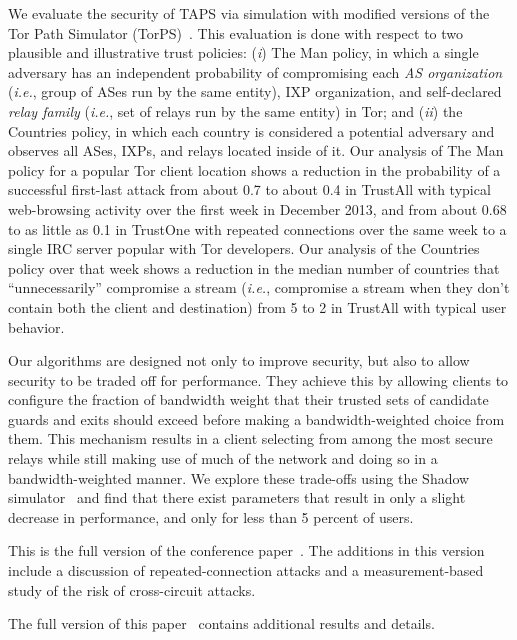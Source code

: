 \documentclass[conference]{styles/IEEEtran}
\newcommand{\ie}{\emph{i.e.}}
\newcommand{\ps}{TAPS\xspace}
\begin{document}
We evaluate the security of \ps via simulation with modified versions of the Tor Path Simulator
(TorPS)~\cite{ccs2013-usersrouted}. This evaluation is done with respect to two plausible and
illustrative trust policies:
(\emph{i}) \textsf{The Man} policy, in which a single adversary has an independent probability of
compromising each \emph{AS organization} (\ie{}, group of ASes run by the same entity), IXP
organization, and self-declared \emph{relay family} (\ie{}, set of relays run by the same entity)
in Tor; and (\emph{ii}) the \textsf{Countries}
policy, in which each country is considered a potential adversary and observes all ASes, IXPs, and
relays located inside of it. Our analysis of \textsf{The Man}
policy for a popular Tor client location shows a reduction in the probability of a successful
first-last attack from about 0.7 to about 0.4 in TrustAll with typical web-browsing activity
over the first week in December 2013,
and from about 0.68 to as little as 0.1 in TrustOne with repeated connections over the same week
to a single IRC
server popular with Tor developers. Our analysis of the \textsf{Countries} policy over that week
shows a reduction in the median number of countries
that ``unnecessarily'' compromise a stream (\ie{}, compromise a stream when they don't contain both
the client and destination) from 5 to 2 in TrustAll with typical user behavior.

Our algorithms are designed not only to improve security, but also to
allow security to be traded off for performance. They achieve this by allowing clients
to configure the fraction of bandwidth weight that their trusted sets of candidate guards
and exits should exceed before making a bandwidth-weighted choice from them. This mechanism
results in a client selecting from among the most secure relays while still
making use of much of the network and doing so in a bandwidth-weighted manner. We explore these
trade-offs using the Shadow simulator~\cite{jansen2012shadow,shadowweb} and find that there exist
parameters that result in only a slight decrease in performance, and only for less than 5 percent of
users.


\ifarxiv

This is the full version of the conference paper~\cite{taps-ndss2017}. The additions in this version
include a discussion of repeated-connection attacks and a measurement-based study of the risk of
cross-circuit attacks.

\else

The full version of this paper~\cite{taps-arxiv} contains additional results and details.
\end{document}
